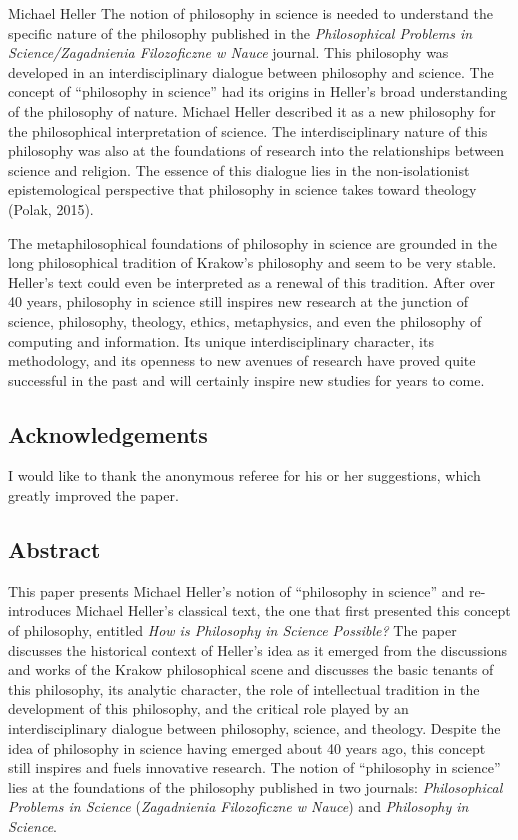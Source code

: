 \begin{artengenv}{Michael Heller}
The notion of philosophy in science is needed to understand the specific nature of the philosophy published in the
\textit{Philosophical Problems in Science/Zagadnienia Filozoficzne w Nauce} journal. This philosophy was developed in
an interdisciplinary dialogue between philosophy and science. The concept of “philosophy in science” had its origins in
Heller’s broad understanding of the philosophy of nature. Michael Heller described it as a new philosophy for the
philosophical interpretation of science. The interdisciplinary nature of this philosophy was also at the foundations of
research into the relationships between science and religion. The essence of this dialogue lies in the non-isolationist
epistemological perspective that philosophy in science takes toward theology (Polak, 2015).

The metaphilosophical foundations of philosophy in science are grounded in the long philosophical tradition of Krakow’s
philosophy and seem to be very stable. Heller’s text could even be interpreted as a renewal of this tradition. After
over 40 years, philosophy in science still inspires new research at the junction of science, philosophy, theology,
ethics, metaphysics, and even the philosophy of computing and information. Its unique interdisciplinary character, its
methodology, and its openness to new avenues of research have proved quite successful in the past and will certainly
inspire new studies for years to come.

\subsection{Acknowledgements}
I would like to thank the anonymous referee for his or her suggestions, which greatly improved the paper.

\subsection{Abstract}
This paper presents Michael Heller’s notion of “philosophy in science” and re-introduces Michael Heller’s classical
text, the one that first presented this concept of philosophy, entitled \textit{How is Philosophy in Science
Possible?} The paper discusses the historical context of Heller’s idea as it emerged from the discussions and works of
the Krakow philosophical scene and discusses the basic tenants of this philosophy, its analytic character, the role of
intellectual tradition in the development of this philosophy, and the critical role played by an interdisciplinary
dialogue between philosophy, science, and theology. Despite the idea of philosophy in science having emerged about 40
years ago, this concept still inspires and fuels innovative research. The notion of “philosophy in science” lies at the
foundations of the philosophy published in two journals:\textit{ Philosophical Problems in Science}
(\textit{Zagadnienia Filozoficzne w Nauce}) and \textit{Philosophy in Science}.


\end{artengenv}
